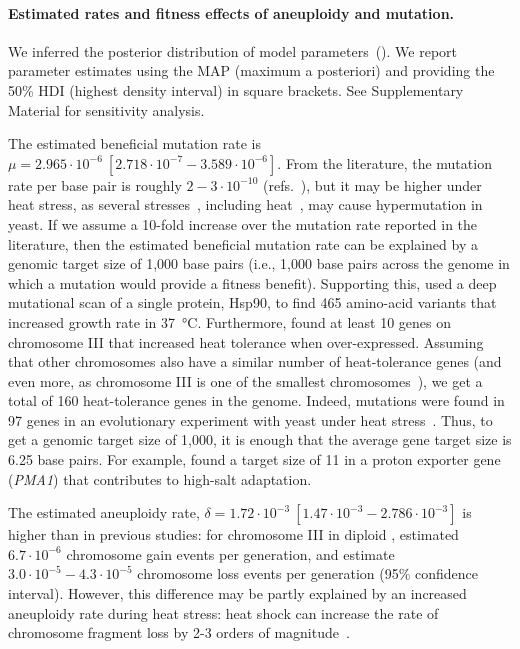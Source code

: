 \documentclass[12pt]{extarticle}
\begin{document}

\paragraph{Estimated rates and fitness effects of aneuploidy and mutation.} 
We inferred the posterior distribution of model parameters~(). 
We report parameter estimates using the MAP (maximum a posteriori) and providing the 50\% HDI (highest density interval) in square brackets. See Supplementary Material for sensitivity analysis.

The estimated beneficial mutation rate is $\mu=2.965\cdot10^{-6}\ [2.718\cdot10^{-7}-3.589\cdot10^{-6}]$. From the literature, the mutation rate per base pair is roughly $2-3\cdot10^{-10}$ (refs.~\citep{Zhu2014,Lynch2008}), but it may be higher under heat stress, as several stresses~\citep{Heidenreich2007}, including heat~\citep{Huang2018}, may cause hypermutation in yeast.
If we assume a 10-fold increase over the mutation rate reported in the literature, then the estimated beneficial mutation rate can be explained by a genomic target size of 1,000 base pairs (i.e., 1,000 base pairs across the genome in which a mutation would provide a fitness benefit).
Supporting this, \citet{Flynn2020} used a deep mutational scan of a single protein, Hsp90, to find 465 amino-acid variants that increased growth rate in \SI{37}{\celsius}.
Furthermore, \citet{Yona2012} found at least 10 genes on chromosome III that increased heat tolerance when over-expressed. Assuming that other chromosomes also have a similar number of heat-tolerance genes (and even more, as chromosome III is one of the smallest chromosomes~\citep{Gilchrist2019}), we get a total of 160 heat-tolerance genes in the genome.
Indeed, mutations were found in 97 genes in an evolutionary experiment with yeast under heat stress~\citep{Huang2018}.
Thus, to get a genomic target size of 1,000, it is enough that the average gene target size is 6.25 base pairs. For example, \citet{Kohn2014} found a target size of 11 in a proton exporter gene (\emph{PMA1}) that contributes to high-salt adaptation.

The estimated aneuploidy rate, $\delta=1.72\cdot10^{-3}\ [1.47\cdot10^{-3}-2.786\cdot10^{-3}]$ is higher than in previous studies: for chromosome III in diploid \yeast, \citet{Zhu2014} estimated $6.7\cdot10^{-6}$ chromosome gain events per generation, and \citet{Kumaran2013} estimate $3.0\cdot10^{-5}-4.3\cdot10^{-5}$ chromosome loss events per generation (95\% confidence interval). 
However, this difference may be partly explained by an increased aneuploidy rate during heat stress: heat shock can increase the rate of chromosome fragment loss by 2-3 orders of magnitude~\citep{Chen2012a}.
\end{document}
